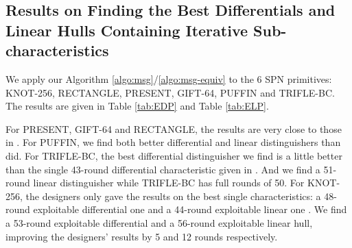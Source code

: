 \subsection{Results on Finding the Best Differentials and Linear Hulls Containing Iterative Sub-characteristics}

We apply our Algorithm \ref{algo:msg}/\ref{algo:msg-equiv} to the 6 SPN primitives: KNOT-256, RECTANGLE, PRESENT, GIFT-64, PUFFIN and TRIFLE-BC. The results are given in Table \ref{tab:EDP} and Table \ref{tab:ELP}. 

For PRESENT, GIFT-64 and RECTANGLE, the results are very close to those in \cite{EPRINT:HalVej18}. For PUFFIN, we find both better differential and linear distinguishers than \cite{EPRINT:HalVej18} did. For TRIFLE-BC, the best differential distinguisher we find is a little better than the single 43-round differential characteristic given in \cite{liu2019iterative}. And we find a 51-round linear distinguisher while TRIFLE-BC has full rounds of 50. For KNOT-256, the designers only gave the results on the best single characteristics: a 48-round exploitable differential one and a 44-round exploitable linear one \cite{zhang2019knot}. We find a 53-round exploitable differential and a 56-round exploitable linear hull, improving the designers' results by 5 and 12 rounds respectively. 


